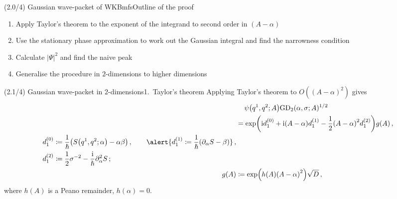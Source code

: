 \documentclass[mathserif]{beamer}
\newcommand{\rbr}[1]{{\left(#1\right)}}
\newcommand{\vbr}[1]{{\left|#1\right|}}
\newcommand{\rfun}[2]{#1\mathopen{}\left(#2\right)\mathclose{}}
\newcommand\mi{\mathrm{i}} %
\newcommand{\Alpha}{A}
\begin{document}
\begin{frame}{(2.0/4) Gaussian wave-packet of WKBmfs}{Outline of the proof}
\begin{enumerate}
    \item 
    Apply Taylor's theorem to the exponent of the integrand to second order in $\rbr{\Alpha-\alpha}$
    \item
    Use the stationary phase approximation to work out the Gaussian integral and find the narrowness condition
    \item
    Calculate $\vbr{\varPsi}^2$ and find the naive peak
    \item
    Generalise the procedure in $2$-dimensions to higher dimensions
\end{enumerate}
\end{frame}

\begin{frame}{\boldmath (2.1/4) Gaussian wave-packet in $2$-dimensions}{1.\ Taylor's theorem}
    Applying Taylor's theorem to $\rfun{O}{\rbr{\Alpha-\alpha}^2}$ gives
\begin{subequations}
\begin{align}
    &\quad\, \rfun{\psi}{q^1, q^2; \Alpha} \rfun{\mathrm{GD}_2}{\alpha, \sigma; \Alpha}^{1/2}
    \nonumber \\
    & = \rfun{\exp}{\mi d^{(0)}_1 +
        \mi \rbr{\Alpha - \alpha} d^{(1)}_1 - \frac{1}{2} \rbr{\Alpha - \alpha}^2 d^{(2)}_1}
    \rfun{g}{\Alpha}\,,
    \label{eq:packet-gaussian-75a}\\
    \begin{split}
    d^{(0)}_1 &\coloneqq \frac{1}{\hslash}\rbr{\rfun{S}{q^1, q^2; \alpha} - \alpha \beta}\,,
    \qquad
    \alert{d^{(1)}_1 \coloneqq \frac{1}{\hslash}\rbr{\partial_{\alpha} S - \beta}}\,,
    \\
    d^{(2)}_1 &\coloneqq \frac{1}{2} \sigma^{-2} - \frac{\mi}{\hslash}\partial_{\alpha}^{2} S\,;
    \end{split}
    \\
    \rfun{g}{\Alpha} &\coloneqq \rfun{\exp}{\rfun{h}{\Alpha}\rbr{\Alpha - \alpha}^2}\sqrt{D}\,, 
\end{align}
\end{subequations}
where $\rfun{h}{\Alpha}$ is a Peano remainder, $\rfun{h}{\alpha} = 0$.
\end{frame}
\end{document}
